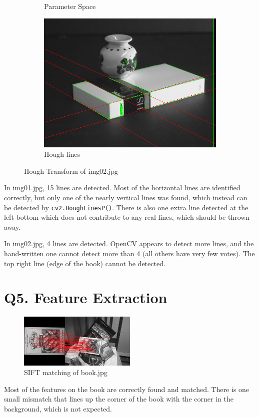 \documentclass{article}
\begin{document}
\begin{figure}[htb!]
\begin{subfigure}[t]{0.3\textwidth}
			\caption{\label{fig:hough-02}Parameter Space}
		\end{subfigure}
		\hfill
		\begin{subfigure}[t]{0.3\textwidth}
			\centering
			\includegraphics[width=\textwidth]{img/line02.png}
			\caption{\label{fig:line-02}Hough lines}
		\end{subfigure}
		\caption{\label{fig:q3-2}Hough Transform of img02.jpg}
	\end{figure}

	In img01.jpg, 15 lines are detected. Most of the horizontal lines are identified correctly, but only one of the nearly vertical lines was found, which instead can be detected by \texttt{cv2.HoughLinesP()}. There is also one extra line detected at the left-bottom which does not contribute to any real lines, which should be thrown away.

	In img02.jpg, 4 lines are detected. OpenCV appears to detect more lines, and the hand-written one cannot detect more than 4 (all others have very few votes). The top right line (edge of the book) cannot be detected.

\section*{Q5. Feature Extraction}

	\begin{figure}[htb!]
		\centering
		\includegraphics[width=0.5\textwidth]{img/book.jpg}
		\caption{\label{fig:book}SIFT matching of book.jpg}
	\end{figure}

	Most of the features on the book are correctly found and matched. There is one small mismatch that lines up the corner of the book with the corner in the background, which is not expected.


\end{document}
